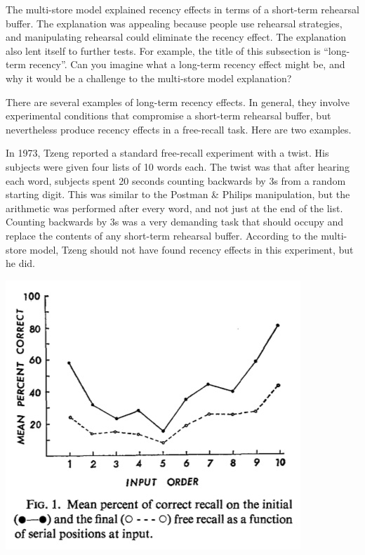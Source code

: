 \documentclass[
  oneside,
  12pt]{crumpbook}
\newenvironment{floatright50}{%
  \wrapfigure{R}{.5\textwidth}%
  }{%
  \endwrapfigure}
\begin{document}
The multi-store model explained recency effects in terms of a short-term rehearsal buffer. The explanation was appealing because people use rehearsal strategies, and manipulating rehearsal could eliminate the recency effect. The explanation also lent itself to further tests. For example, the title of this subsection is ``long-term recency''. Can you imagine what a long-term recency effect might be, and why it would be a challenge to the multi-store model explanation?

There are several examples of long-term recency effects. In general, they involve experimental conditions that compromise a short-term rehearsal buffer, but nevertheless produce recency effects in a free-recall task. Here are two examples.

In 1973, Tzeng reported a standard free-recall experiment with a twist. His subjects were given four lists of 10 words each. The twist was that after hearing each word, subjects spent 20 seconds counting backwards by 3s from a random starting digit. This was similar to the Postman \& Philips manipulation, but the arithmetic was performed after every word, and not just at the end of the list. Counting backwards by 3s was a very demanding task that should occupy and replace the contents of any short-term rehearsal buffer. According to the multi-store model, Tzeng should not have found recency effects in this experiment, but he did.

\begin{floatright50}
\includegraphics[width=1\linewidth]{imgs/Tzeng_1973}

\end{floatright50}
\end{document}
